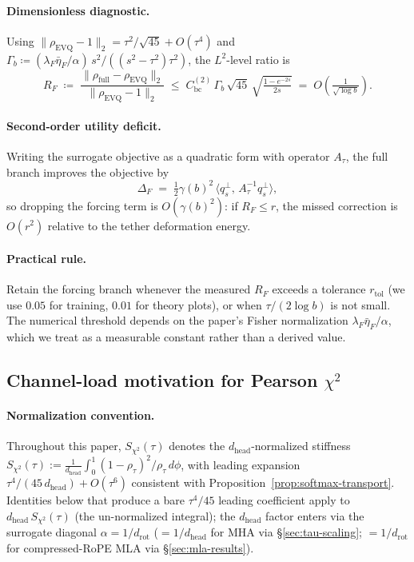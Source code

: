 \paragraph{Dimensionless diagnostic.} Using $\|\rho_{\mathrm{EVQ}}-1\|_2 = \tau^2/\sqrt{45}+O(\tau^4)$ and $\Gamma_b \coloneqq (\lambda_F\bar\eta_F/\alpha)\,s^2/((s^2-\tau^2)\tau^2)$, the $L^2$-level ratio is
\begin{equation}
R_F \;\coloneqq\; \frac{\|\rho_{\mathrm{full}}-\rho_{\mathrm{EVQ}}\|_2}{\|\rho_{\mathrm{EVQ}}-1\|_2} \;\le\; C_{\mathrm{bc}}^{(2)}\,\Gamma_b\,\sqrt{45}\,\sqrt{\tfrac{1-e^{-2s}}{2s}} \;=\; O\!\left(\tfrac{1}{\sqrt{\log b}}\right).
\label{eq:RF}
\end{equation}

\paragraph{Second-order utility deficit.} Writing the surrogate objective as a quadratic form with operator $A_\tau$, the full branch improves the objective by
\begin{equation}
\Delta_F \;=\; \tfrac{1}{2}\gamma(b)^2\,\langle q_s^\perp,\,A_\tau^{-1} q_s^\perp\rangle,
\label{eq:tether-deficit}
\end{equation}
so dropping the forcing term is $O(\gamma(b)^2)$: if $R_F\!\le\!r$, the missed correction is $O(r^2)$ relative to the tether deformation energy.

\paragraph{Practical rule.} Retain the forcing branch whenever the measured $R_F$ exceeds a tolerance $r_{\mathrm{tol}}$ (we use $0.05$ for training, $0.01$ for theory plots), or when $\tau/(2\log b)$ is not small. The numerical threshold depends on the paper's Fisher normalization $\lambda_F\bar\eta_F/\alpha$, which we treat as a measurable constant rather than a derived value.

\subsection{Channel-load motivation for Pearson \texorpdfstring{$\chi^2$}{chi2}}
\label{sec:chi2-load}

\paragraph{Normalization convention.} Throughout this paper, $S_{\chi^2}(\tau)$ denotes the $d_{\mathrm{head}}$-normalized stiffness $S_{\chi^2}(\tau){:=}\frac{1}{d_{\mathrm{head}}}\!\int_0^1\!(1{-}\rho_\tau)^2/\rho_\tau\,d\phi$, with leading expansion $\tau^4/(45\,d_{\mathrm{head}}){+}O(\tau^6)$ consistent with Proposition~\ref{prop:softmax-transport}. Identities below that produce a bare $\tau^4/45$ leading coefficient apply to $d_{\mathrm{head}}\,S_{\chi^2}(\tau)$ (the un-normalized integral); the $d_{\mathrm{head}}$ factor enters via the surrogate diagonal $\alpha{=}1/d_{\mathrm{rot}}$ ($={}1/d_{\mathrm{head}}$ for MHA via \S\ref{sec:tau-scaling}; ${=}1/d_{\mathrm{rot}}$ for compressed-RoPE MLA via \S\ref{sec:mla-results}).

